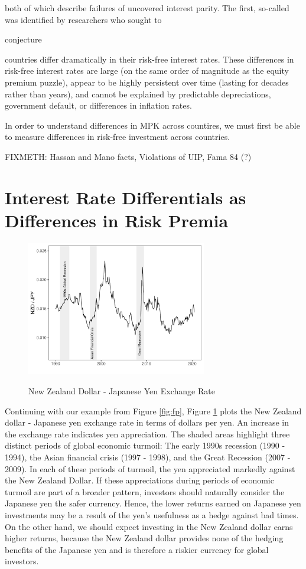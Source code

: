 \documentclass{ar-1col}
\begin{document}
$$ $$ both of which describe failures of uncovered interest parity. The first, so-called  was identified by researchers who sought to  


conjecture


countries differ dramatically in their risk-free interest rates. These
differences in risk-free interest rates are large (on the same order
of magnitude as the equity premium puzzle), appear to be highly
persistent over time (lasting for decades rather than years), and
cannot be explained by predictable depreciations, government default,
or differences in inflation rates.



In order to understand differences in MPK across countires, we must 
first be able to measure differences in risk-free investment across 
countries. 

FIXMETH: Hassan and Mano facts, Violations of UIP, Fama 84 (?)

\section{Interest Rate Differentials as Differences in Risk Premia}

\begin{figure}[htp!]
    \centering
    \caption{New Zealand Dollar - Japanese Yen Exchange Rate} 
    \includegraphics[width=0.7\textwidth]{Exhibits/Figure_FX_JPYNZD.pdf}
    \label{fig:spot}
\end{figure}
Continuing with our example from Figure \ref{fig:fp}, Figure \ref{fig:spot} plots the New
Zealand dollar - Japanese yen exchange rate in terms of dollars per
yen. An increase in the exchange rate indicates yen appreciation.
The shaded areas highlight three distinct periods of global economic
turmoil: The early 1990s recession (1990 - 1994), the Asian financial
crisis (1997 - 1998), and the Great Recession (2007 - 2009). In each of these periods of turmoil, the yen appreciated markedly against the New Zealand Dollar. If these appreciations during periods of economic
turmoil are part of a broader pattern, investors should naturally consider the Japanese yen the safer
currency. Hence, the lower returns earned on Japanese yen investments 
may be a result of the yen's usefulness as a hedge against bad times. 
On the other hand, we should expect investing in the New Zealand dollar 
earns higher returns, because the New Zealand dollar provides none of 
the hedging benefits of the Japanese yen and is therefore a riskier 
currency for global investors.
\end{document}
